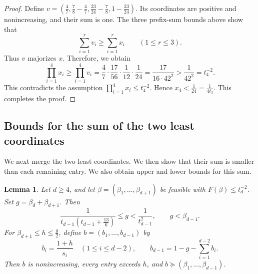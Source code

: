 \documentclass[reqno, 11pt]{article}
\numberwithin{equation}{section}
\newtheorem{lemma}[lemma]{Lemma}
\theoremstyle{definition}
\begin{document}
\begin{proof}
Define
$v = \left( \frac{4}{7}, \frac{7}{8} - \frac{4}{7}, \frac{23}{24} - \frac{7}{8}, 1 - \frac{23}{24} \right).
$
Its coordinates are positive and nonincreasing, and their
sum is one. The three prefix-sum bounds above show that
\[
 \sum_{i=1}^r v_i
 \ge
 \sum_{i=1}^r x_i
 \qquad(1\le r\le3).
\]
Thus $v$ majorizes $x$. Therefore, we obtain 
\[
 \prod_{i=1}^4x_i\ge\prod_{i=1}^4v_i =
 \frac47\cdot\frac{17}{56}\cdot\frac1{12}\cdot\frac1{24}
 =
 \frac{17}{16\cdot42^2}
 >
 \frac1{42^2}=t_4^{-2}.
\]
This contradicts the assumption $\prod_{i=1}^4x_i\le t_4^{-2}$.
Hence $x_4<\frac{1}{24}=\frac{1}{4t_3}$. This completes the proof.
\end{proof}

\subsection{Bounds for the sum of the two least coordinates}

We next merge the two least coordinates. We then show that their sum is
smaller than each remaining entry. We also obtain upper and lower bounds for this sum.

\begin{lemma}\label{orb:lem:separation}
Let $d\ge4$, and let $\beta=(\beta_1,\ldots,\beta_{d+1})$ be feasible
with $F(\beta)\le t_d^{-2}$. Set $g=\beta_d+\beta_{d+1}$. Then
\begin{equation}\label{ra:eq:initial-g}
 \frac{1}{t_{d-1}\left(t_{d-1}+\frac{13}{6}\right)}\le g<\frac{1}{t_{d-1}^2},
 \qquad g<\beta_{d-1}.
\end{equation}
For $\beta_{d+1}\le h\le \frac{g}{2}$, define $b=(b_1,\ldots,b_{d-1})$ by
\begin{equation}\label{ra:eq:comparison-vector}
 b_i=\frac{1+h}{s_i}\quad(1\le i\le d-2),\qquad
 b_{d-1}=1-g-\sum_{i=1}^{d-2}b_i.
\end{equation}
Then $b$ is nonincreasing, every entry exceeds $h$, and
$b\succeq(\beta_1,\ldots,\beta_{d-1})$.
\end{lemma}
\end{document}
